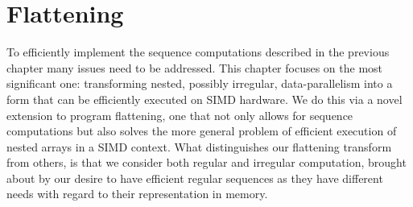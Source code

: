 \chapter{Flattening}%
\label{chap:theory}

To efficiently implement the sequence computations described in the previous chapter many issues need to be addressed. This chapter focuses on the most significant one: transforming nested, possibly irregular, data-parallelism into a form that can be efficiently executed on SIMD hardware. We do this via a novel extension to program flattening, one that not only allows for sequence computations but also solves the more general problem of efficient execution of nested arrays in a SIMD context. What distinguishes our flattening transform from others, is that we consider both regular and irregular computation, brought about by our desire to have efficient regular sequences as they have different needs with regard to their representation in memory.






